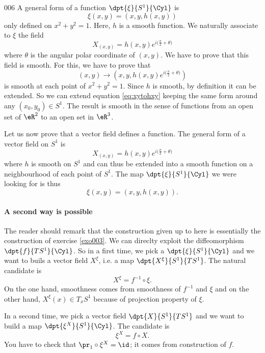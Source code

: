 \begin{corrige}{006}
A general form of a function $\dpt{ \xi }{ S^1 }{ \Cyl }$ is
\[ 
  \xi(x,y)=(x,y,h(x,y))
\]
only defined on $x^2+y^2=1$. Here, $h$ is a smooth function. We naturally associate to $\xi$ the field
\[ 
  X_{(x,y)}=h(x,y)e^{i\big( \frac{ \pi }{ 2 }+\theta \big)}
\]
where $\theta$ is the angular polar coordinate of $(x,y)$. We have to prove that this field is smooth. For this, we have to prove that 
\begin{equation} \label{eq:xytohxy}
  (x,y)\to(x,y,h(x,y)e^{i\big( \frac{ \pi }{ 2 }+\theta \big)})
\end{equation}
is smooth at each point of $x^2+y^2=1$. Since $h$ is smooth, by definition it can be extended. So we can extend equation \eqref{eq:xytohxy} keeping the same form around any $(x_0,y_0)\in S^1$. The result is smooth in the sense of functions from an open set of $\eR^2$ to an open set in $\eR^3$. 


Let us now prove that a vector field defines a function. The general form of a vector field on $S^1$ is 
\begin{equation}
X_{(x,y)}=h(x,y)e^{i\big(\frac{ \pi }{ 2 }+\theta\big)}
\end{equation}
where $h$ is smooth on $S^1$ and can thus be extended into a smooth function on a neighbourhood of each point of $S^1$. The map $\dpt{ \xi }{ S^1 }{ \Cyl }$ we were looking for is thus
\[ 
  \xi(x,y)=(x,y,h(x,y)).
\]

\paragraph{A second way is possible}

The reader should remark that the construction given up to here is essentially the construction of exercise \ref{exo003}. We can direclty exploit the diffeomorphism $\dpt{ f }{ TS^1 }{ \Cyl }$. So in a first time, we pick a $\dpt{ \xi }{ S^1 }{ \Cyl }$ and we want to buils a vector field $X^{\xi}$, i.e. a map $\dpt{ X^{\xi} }{ S^1 }{ TS^1 }$. The natural candidate is
\[ 
  X^{\xi}=f^{-1}\circ\xi.
\]
On the one hand, smoothness comes from smoothness of $f^{-1}$ and $\xi$ and on the other hand, $X^{\xi}(x)\in T_xS^1$ because of projection property of $\xi$.

In a second time, we pick a vector field $\dpt{ X }{ S^1 }{ TS^1 }$ and we want to build a map $\dpt{ \xi^{X} }{ S^1 }{ \Cyl }$. The candidate is 
\[
\xi^X=f\circ X.
\]
 You have to check that $\pr_1\circ\xi^X=\id$; it comes from construction of $f$.


\end{corrige}
